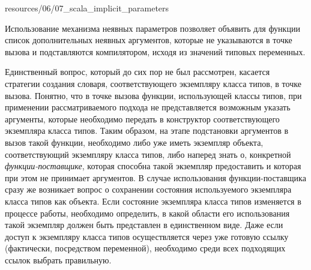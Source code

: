 
{resources/06/07_scala_implicit_parameters}

Использование механизма неявных параметров позволяет объявить для функции список дополнительных неявных аргументов, которые не указываются в точке вызова и подставляются компилятором, исходя из значений типовых переменных.

 Единственный вопрос, который до сих пор не был рассмотрен, касается стратегии создания словаря, соответствующего экземпляру класса типов, в точке вызова. Понятно, что в точке вызова функции, использующей классы типов, при применении рассматриваемого подхода не представляется возможным указать аргументы, которые необходимо передать в конструктор соответствующего экземпляра класса типов. Таким образом, на этапе подстановки аргументов в вызов такой функции, необходимо либо уже иметь экземпляр объекта, соответствующий экземпляру класса типов, либо наперед знать о, конкретной \emph{функции-поставщике}, которая способна такой экземпляр предоставить и которая при этом не принимает аргументов. В случае использования функции-поставщика сразу же возникает вопрос о сохранении состояния используемого экземпляра класса типов как объекта. Если состояние экземпляра класса типов изменяется в процессе работы, необходимо определить, в какой области его использования такой экземпляр должен быть представлен в единственном виде. Даже если доступ к экземпляру класса типов осуществляется через уже готовую ссылку (фактически, посредством переменной), необходимо среди всех подходящих ссылок выбрать правильную. 

